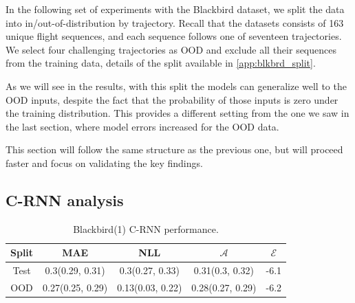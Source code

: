 In the following set of experiments with the Blackbird dataset, we split the data into in/out-of-distribution by trajectory. Recall that the datasets consists of 163 unique flight sequences, and each sequence follows one of seventeen trajectories. We select four challenging trajectories as OOD and exclude all their sequences from the training data, details of the split available in \cref{app:blkbrd_split}. 

As we will see in the results, with this split the models can generalize well to the OOD inputs, despite the fact that the probability of those inputs is zero under the training distribution. This provides a different setting from the one we saw in the last section, where model errors increased for the OOD data.

This section will follow the same structure as the previous one, but will proceed faster and focus on validating the key findings. 

\subsection{C-RNN analysis}

\begin{table}[h]
\centering
    \begin{tabular}{c  c  c   c  c }  
        \toprule
        Split & MAE & NLL & $\mathcal{A}$ & $\mathcal{E}$\\
        \midrule
        Test & 0.3(0.29, 0.31) & 0.3(0.27, 0.33) & 0.31(0.3, 0.32) &  -6.1\\
        OOD  &  0.27(0.25, 0.29) &  0.13(0.03, 0.22) & 0.28(0.27, 0.29)&  -6.2\\
        \midrule
    \end{tabular}
    \caption{Blackbird(1) C-RNN performance.}
    \label{tbl:bb1_CRNN}
\end{table}

